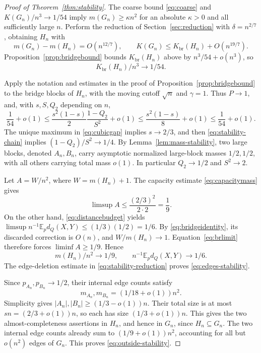 \documentclass[11pt]{amsart}
\numberwithin{equation}{section}
\theoremstyle{definition}
\theoremstyle{remark}
\newcommand{\E}{\mathbb E}
\newcommand{\Kbr}{K_{\mathrm{br}}}
\begin{document}
\begin{proof}[Proof of Theorem~\ref{thm:stability}]
The coarse bound \eqref{eq:coarse} and $K(G_n)/n^3\to1/54$ imply $m(G_n)\ge\kappa n^2$ for an absolute $\kappa>0$ and all sufficiently large $n$. Perform the reduction of Section~\ref{sec:reduction} with $\delta=n^{2/7}$, obtaining $H_n$ with
\begin{equation}\label{eq:stability-reduction}
m(G_n)-m(H_n)=O(n^{12/7}),\qquad
K(G_n)\le\Kbr(H_n)+O(n^{19/7}).
\end{equation}
Proposition~\ref{prop:bridgebound} bounds $\Kbr(H_n)$ above by $n^3/54+o(n^3)$, so
\begin{equation}\label{eq:brlimit}
\Kbr(H_n)/n^3\longrightarrow1/54.
\end{equation}

Apply the notation and estimates in the proof of Proposition~\ref{prop:bridgebound} to the bridge blocks of $H_n$, with the moving cutoff $\sqrt n$ and $\gamma=1$. Thus $P\to1$, and, with $s,S,Q_2$ depending on $n$,
\begin{equation}\label{eq:stability-chain}
\frac1{54}+o(1)
\le\frac{s^2(1-s)}2\frac{1-Q_2}{S^2}+o(1)
\le\frac{s^2(1-s)}8+o(1)
\le\frac1{54}+o(1).
\end{equation}
The unique maximum in \eqref{eq:cubicgap} implies $s\to2/3$, and then \eqref{eq:stability-chain} implies $(1-Q_2)/S^2\to1/4$. By Lemma~\ref{lem:mass-stability}, two large blocks, denoted $A_n,B_n$, carry asymptotic normalized large-block masses $1/2,1/2$, with all others carrying total mass $o(1)$. In particular $Q_2\to1/2$ and $S^2\to2$.

Let $A=W/n^2$, where $W=m(H_n)+1$. The capacity estimate \eqref{eq:capacitymass} gives
\[
\limsup A\le\frac{(2/3)^2}{2\cdot2}=\frac19.
\]
On the other hand, \eqref{eq:distancebudget} yields
$\limsup n^{-1}\E_p d_Q(X,Y)\le(1/3)(1/2)=1/6$.
By \eqref{eq:bridgeidentity}, its discarded correction is $O(n)$, and $W/m(H_n)\to1$. Equation~\eqref{eq:brlimit} therefore forces $\liminf A\ge1/9$. Hence
\begin{equation}\label{eq:alpha-stability}
m(H_n)/n^2\to1/9,\qquad n^{-1}\E_p d_Q(X,Y)\to1/6.
\end{equation}
The edge-deletion estimate in \eqref{eq:stability-reduction} proves \eqref{eq:edges-stability}.

Since $p_{A_n},p_{B_n}\to1/2$, their internal edge counts satisfy
\[
m_{A_n},m_{B_n}=(1/18+o(1))n^2.
\]
Simplicity gives $|A_n|,|B_n|\ge(1/3-o(1))n$. Their total size is at most $sn=(2/3+o(1))n$, so each has size $(1/3+o(1))n$. This gives the two almost-completeness assertions in $H_n$, and hence in $G_n$, since $H_n\subseteq G_n$. The two internal edge counts already sum to $(1/9+o(1))n^2$, accounting for all but $o(n^2)$ edges of $G_n$. This proves \eqref{eq:outside-stability}.


\end{proof}
\end{document}
